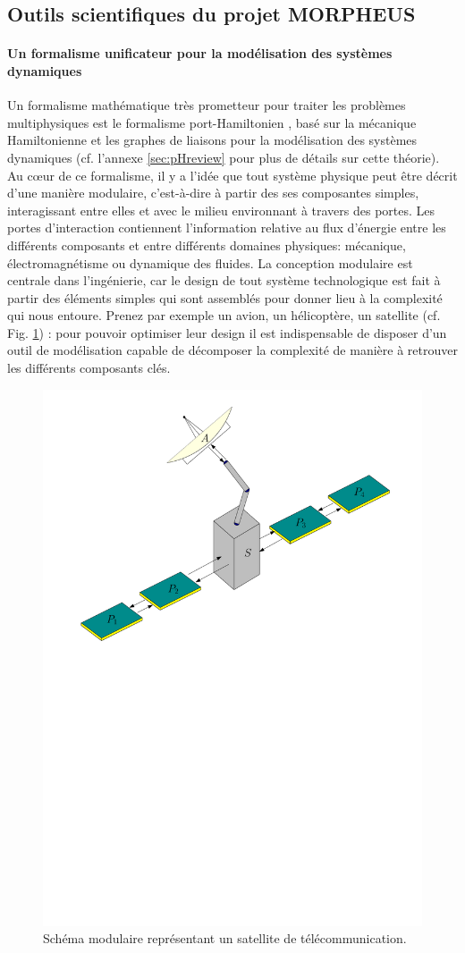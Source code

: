 \documentclass[12pt, french]{article}
\begin{document}
	
	\subsection{Outils scientifiques du projet MORPHEUS}
	
	
	\paragraph{\large Un formalisme unificateur pour la modélisation des systèmes dynamiques\\}
	Un formalisme mathématique très prometteur pour traiter les problèmes multiphysiques est le formalisme port-Hamiltonien \cite{vanderSchaft2002}, basé sur la mécanique Hamiltonienne et les graphes de liaisons pour la modélisation des systèmes dynamiques (cf. l'annexe \ref{sec:pHreview} pour plus de détails sur cette théorie). Au c\oe{}ur de ce formalisme, il y a l'idée que tout système physique peut être décrit d'une manière modulaire, c'est-à-dire à partir des ses composantes simples, interagissant entre elles et avec le milieu environnant à travers des portes. Les portes d'interaction contiennent l'information relative au flux d'énergie entre les différents composants et entre différents domaines physiques: mécanique, électromagnétisme ou dynamique des fluides. La conception modulaire est centrale dans l'ingénierie, car le design de tout système technologique est fait à partir des éléments simples qui sont assemblés pour donner lieu à la complexité qui nous entoure. Prenez par exemple un avion, un hélicoptère, un satellite (cf. Fig. \ref{fig:satellite}) : pour pouvoir optimiser leur design il est indispensable de disposer d'un outil de modélisation capable de décomposer la complexité de manière à retrouver les différents composants clés. 
	
	\begin{figure}[hb]
		\centering
		\includegraphics[width=.55\textwidth]{satellite.pdf}
		\caption{Schéma modulaire représentant un satellite de télécommunication.}
		\label{fig:satellite}
	\end{figure}
	
\end{document}
